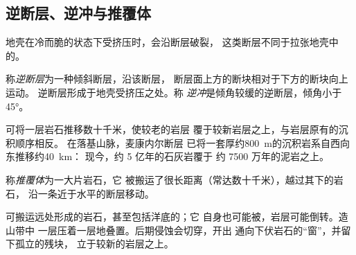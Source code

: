 
\subsection{逆断层、逆冲与推覆体}

地壳在冷而脆的状态下受挤压时，会沿断层破裂，
这类断层不同于拉张地壳中的。

\begin{definition}[逆断层；逆冲]\label{def:g12:mountain-building:thrust}
称\emph{逆断层}为一种倾斜断层，沿该断层，
断层面上方的断块相对于下方的断块向上运动。
逆断层形成于地壳受挤压之处。称
\emph{逆冲}是倾角较缓的逆断层，倾角小于
\ang{45}。
\end{definition}

可将一层岩石推移数十千米，使较老的岩层
覆于较新岩层之上，与岩层原有的沉积顺序相反。
在落基山脉，麦康内尔断层
已将一套厚约\qty{800}{m}的沉积岩系自西向东推移约\qty{40}{km}：
现今，约 5 亿年的石灰岩覆于
约 7500 万年的泥岩之上。

\begin{definition}[推覆体]\label{def:g12:mountain-building:nappe}
称\emph{推覆体}为一大片岩石，它
被搬运了很长距离（常达数十千米），越过其下的岩石，
沿一条近于水平的断层移动。
\end{definition}

可搬运远处形成的岩石，甚至包括洋底的；它
自身也可能被，岩层可能倒转。造山带中
一层压着一层地叠置。后期侵蚀会切穿，开出
通向下伏岩石的“窗”，并留下孤立的残块，
立于较新的岩层之上。

